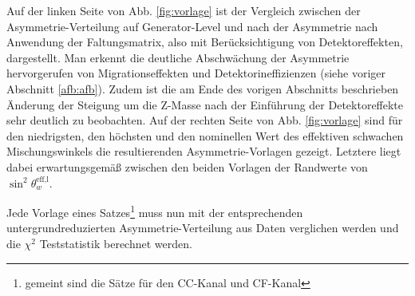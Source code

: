 Auf der linken Seite von Abb. \ref{fig:vorlage} ist der Vergleich zwischen der
Asymmetrie-Verteilung auf Generator-Level und nach der Asymmetrie nach
Anwendung der Faltungsmatrix, also mit Berücksichtigung von Detektoreffekten,
dargestellt. Man erkennt die deutliche Abschwächung der Asymmetrie
hervorgerufen von Migrationseffekten und Detektorineffizienzen (siehe voriger
Abschnitt \ref{afb:afb}). Zudem ist die am Ende des vorigen Abschnitts
beschrieben Änderung der Steigung um die Z-Masse nach der Einführung der
Detektoreffekte sehr deutlich zu beobachten. Auf der rechten Seite von Abb.
\ref{fig:vorlage} sind für den niedrigsten, den höchsten und den nominellen
Wert des effektiven schwachen Mischungswinkels die resultierenden
Asymmetrie-Vorlagen gezeigt. Letztere liegt dabei erwartungsgemäß zwischen den
beiden Vorlagen der Randwerte von $\sin^2\theta_w^\text{eff,l}$.


Jede Vorlage eines Satzes\footnote{gemeint sind die Sätze für den \ac{CC}-Kanal
und \ac{CF}-Kanal} muss nun mit der entsprechenden untergrundreduzierten
Asymmetrie-Verteilung aus Daten verglichen werden und die $\chi^2$
Teststatistik berechnet werden.




 


